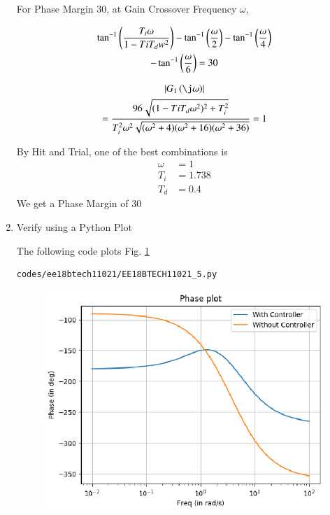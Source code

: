 \begin{enumerate}[label=\thesubsection.\arabic*.,ref=\thesubsection.\theenumi]
For Phase Margin 30\degree, at Gain Crossover Frequency $\omega$,

\begin{multline}
    \tan^{-1}\left(\frac{T_{i}\omega}{1-T{i}T_{d}w^2}\right) - \tan^{-1}\left(\frac{\omega}{2}\right) - \tan^{-1}\left(\frac{\omega}{4}\right)
\\
-    \tan^{-1}\left(\frac{\omega}{6}\right) = 30
\end{multline}

\begin{multline}
    \abs{G_{1}\brak{\j\omega}} 
\\
= \frac{96\sqrt{(1-T{i}T_{d}\omega^2)^2 + T_{i}^2}}{T_{i}^2\omega^2\sqrt{(\omega^2+4)(\omega^2 + 16)(\omega^2 + 36)}} = 1
\end{multline}

By Hit and Trial, one of the best combinations is
\begin{align}
    \omega &= 1
\\
    T_{i} &= 1.738
\\
    T_{d} &= 0.4
\end{align}
We get a Phase Margin of 30\degree

\item
Verify using a Python Plot

\solution  The following code plots Fig. \ref{fig:EE18BTECH11021_PID}

\begin{lstlisting}
codes/ee18btech11021/EE18BTECH11021_5.py
\end{lstlisting}

\begin{figure}[!ht]
\centering
\includegraphics[width=\columnwidth]{./figs/ee18btech11021/EE18BTECH11021_PID.eps}
\caption{}
\label{fig:EE18BTECH11021_PID}
\end{figure}
\end{enumerate}
